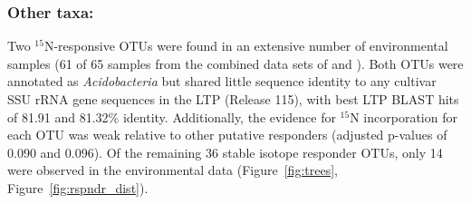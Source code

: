\subsubsection{\textbf{Other taxa:}} Two $^{15}$N-responsive OTUs were found
in an extensive number of environmental samples (61 of 65 samples from the
combined data sets of \citet{Garcia_Pichel_2013} and \citet{Steven_2013}).
Both OTUs were annotated as \textit{Acidobacteria} but shared little sequence
identity to any cultivar SSU rRNA gene sequences in the LTP (Release 115),
with best LTP BLAST hits of 81.91 and 81.32\% identity. Additionally, the
evidence for $^{15}$N incorporation for each OTU was weak relative to other
putative responders (adjusted p-values of 0.090 and 0.096). Of the remaining
36 stable isotope responder OTUs, only 14 were observed in the environmental
data (Figure~\ref{fig:trees}, Figure~\ref{fig:rspndr_dist}).
%
%
